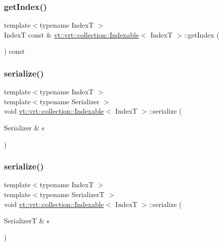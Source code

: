 \subsubsection{\texorpdfstring{get\+Index()}{getIndex()}}
{\footnotesize\ttfamily template$<$typename IndexT $>$ \\
IndexT const  \& \hyperlink{structvt_1_1vrt_1_1collection_1_1_indexable}{vt\+::vrt\+::collection\+::\+Indexable}$<$ IndexT $>$\+::get\+Index (\begin{DoxyParamCaption}{ }\end{DoxyParamCaption}) const}

\mbox{\label{structvt_1_1vrt_1_1collection_1_1_indexable_a6c95be93183665a0d03c149207f000f9}} 
\subsubsection{\texorpdfstring{serialize()}{serialize()}\hspace{0.1cm}{\footnotesize\ttfamily [1/2]}}
{\footnotesize\ttfamily template$<$typename IndexT $>$ \\
template$<$typename Serializer $>$ \\
void \hyperlink{structvt_1_1vrt_1_1collection_1_1_indexable}{vt\+::vrt\+::collection\+::\+Indexable}$<$ IndexT $>$\+::serialize (\begin{DoxyParamCaption}\item[{Serializer \&}]{s }\end{DoxyParamCaption})\hspace{0.3cm}{\ttfamily [protected]}}

\mbox{\label{structvt_1_1vrt_1_1collection_1_1_indexable_adadd30272517d10e6124a65edc48fb65}} 
\subsubsection{\texorpdfstring{serialize()}{serialize()}\hspace{0.1cm}{\footnotesize\ttfamily [2/2]}}
{\footnotesize\ttfamily template$<$typename IndexT $>$ \\
template$<$typename SerializerT $>$ \\
void \hyperlink{structvt_1_1vrt_1_1collection_1_1_indexable}{vt\+::vrt\+::collection\+::\+Indexable}$<$ IndexT $>$\+::serialize (\begin{DoxyParamCaption}\item[{SerializerT \&}]{s }\end{DoxyParamCaption})}


